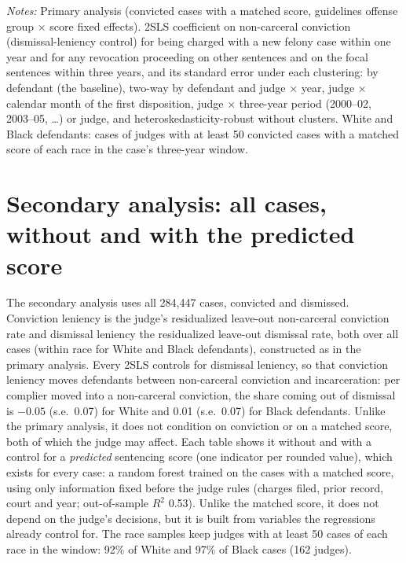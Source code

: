 \documentclass[11pt]{article}
\newcommand{\tabnote}[1]{\par\vspace{0.6ex}\begin{minipage}{\linewidth}\linespread{1}\footnotesize\textit{Notes:} #1\end{minipage}}
\newcommand{\racesamplenoteprim}{White and Black defendants: cases of judges with at least 50 convicted cases with a matched score of each race in the case's three-year window.}
\begin{document}
\begin{table}[H]
\centering
\caption{Standard errors under other clusterings, primary analysis}\label{tab:clusters}
{\small\renewcommand{\arraystretch}{0.9}\resizebox{\textwidth}{!}{}}
\tabnote{Primary analysis (convicted cases with a matched score, guidelines offense group $\times$ score fixed effects). 2SLS coefficient on non-carceral conviction (dismissal-leniency control) for being charged with a new felony case within one year and for any revocation proceeding on other sentences and on the focal sentences within three years, and its standard error under each clustering: by defendant (the baseline), two-way by defendant and judge $\times$ year, judge $\times$ calendar month of the first disposition, judge $\times$ three-year period (2000--02, 2003--05, \ldots) or judge, and heteroskedasticity-robust without clusters. \racesamplenoteprim}
\end{table}

\section{Secondary analysis: all cases, without and with the predicted score}\label{sec:secondary}

The secondary analysis uses all 284,447 cases, convicted and dismissed. Conviction leniency is the judge's residualized leave-out non-carceral conviction rate and dismissal leniency the residualized leave-out dismissal rate, both over all cases (within race for White and Black defendants), constructed as in the primary analysis. Every 2SLS controls for dismissal leniency, so that conviction leniency moves defendants between non-carceral conviction and incarceration: per complier moved into a non-carceral conviction, the share coming out of dismissal is $-0.05$ (s.e.\ 0.07) for White and 0.01 (s.e.\ 0.07) for Black defendants. Unlike the primary analysis, it does not condition on conviction or on a matched score, both of which the judge may affect. Each table shows it without and with a control for a \emph{predicted} sentencing score (one indicator per rounded value), which exists for every case: a random forest trained on the cases with a matched score, using only information fixed before the judge rules (charges filed, prior record, court and year; out-of-sample $R^2$ 0.53). Unlike the matched score, it does not depend on the judge's decisions, but it is built from variables the regressions already control for. The race samples keep judges with at least 50 cases of each race in the window: 92\% of White and 97\% of Black cases (162 judges).
\end{document}
